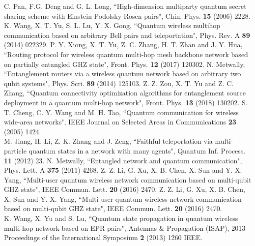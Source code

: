 \documentclass[aps,pra,twocolumn,showpacs,superscriptaddress,groupedaddress]{revtex4}
\begin{document}
\begin{thebibliography}{99} 
 C. Pan, F.G. Deng and G. L. Long, ``High-dimension multiparty quantum secret sharing scheme with Einstein-Podolsky-Rosen pairs", Chin. Phys. {\bf15} (2006) 2228.
 K. Wang, X. T. Yu, S. L. Lu, Y. X. Gong, ``Quantum wireless multihop communication based on arbitrary Bell pairs and teleportation", Phys. Rev. A {\bf89} (2014) 022329.
 P. Y. Xiong, X. T. Yu, Z. C. Zhang, H. T. Zhan and J. Y. Hua, ``Routing protocol for wireless quantum multi-hop mesh backbone network based on partially entangled GHZ state", Front. Phys. {\bf12} (2017) 120302.
 N. Metwally, ``Entanglement routers via a wireless quantum network based on arbitrary two qubit systems", Phys. Scri. {\bf89} (2014) 125103.
 Z. Z. Zou, X. T. Yu and Z. C. Zhang, ``Quantum connectivity optimization algorithms for entanglement source deployment in a quantum multi-hop network", Front. Phys. {\bf13} (2018) 130202.
 S. T. Cheng, C. Y. Wang and M. H. Tao, ``Quantum communication for wireless wide-area networks", IEEE Journal on Selected Areas in Communications {\bf23} (2005) 1424.\\
M. Jiang, H. Li, Z. K. Zhang and J. Zeng, ``Faithful teleportation via multi-particle quantum states in a network with many agents", Quantum Inf. Process. {\bf11} (2012) 23.
 N. Metwally, ``Entangled network and quantum communication", Phys. Lett. A {\bf375} (2011) 4268.
 Z. Z. Li, G. Xu, X. B. Chen, X. Sun and Y. X. Yang, ``Multi-user quantum wireless network communication based on multi-qubit GHZ state", IEEE Commun. Lett. {\bf20} (2016) 2470.
 Z. Z. Li, G. Xu, X. B. Chen, X. Sun and Y. X. Yang, ``Multi-user quantum wireless network communication based on multi-qubit GHZ state", IEEE Commun. Lett. {\bf20} (2016) 2470.\\
K. Wang, X. Yu and S. Lu, ``Quantum state propagation in quantum wireless multi-hop network based on EPR pairs", Antennas \& Propagation (ISAP), 2013 Proceedings of the International Symposium {\bf2} (2013) 1260 IEEE.


\end{thebibliography}
\end{document}
